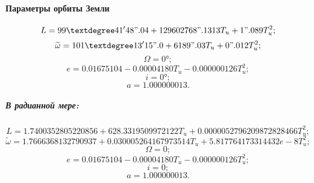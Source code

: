 \paragraph{Параметры орбиты Земли}
$$L = 99°41'48".04 + 129602768".1313 T_u + 1".089 T_u^2;$$
$$\widetilde{\omega} = 101°13'15".0 + 6189".03 T_u + 0".012 T_u^2;$$
$$\Omega = 0°;$$
$$e = 0.01675104 - 0.00004180 T_u - 0.000000126 T_u^2;$$
$$i = 0°;$$
$$a = 1.000000013.$$

\subparagraph{В радианной мере:}
$$L = 1.7400352805220856 + 628.3319509972122 T_u + 0.0000052796209872828466 T_u^2;$$
$$\widetilde{\omega} = 1.7666368132790937 + 0.030005264167973514 T_u + 5.817764173314432e-8 T_u^2;$$
$$\Omega = 0;$$
$$e = 0.01675104 - 0.00004180 T_u - 0.000000126 T_u^2;$$
$$i = 0;$$
$$a = 1.000000013.$$
